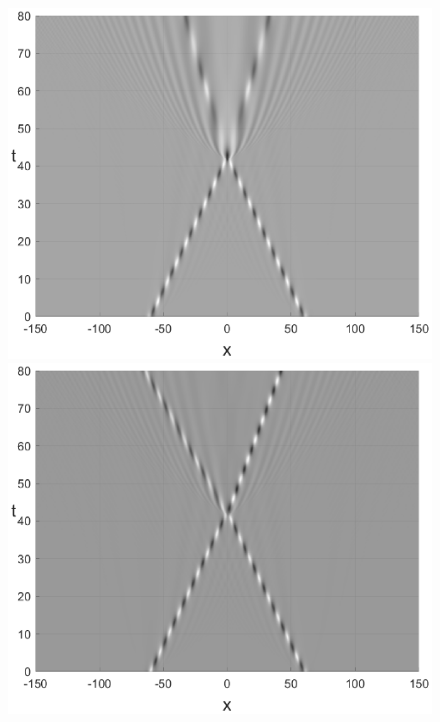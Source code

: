 \documentclass[preprint,12pt]{elsarticle}
\begin{document}
\begin{figure}[H]
\begin{minipage}[h]{0.32\linewidth}
\includegraphics[width=1\linewidth]{fig53g.eps}
\end{minipage}
\begin{minipage}[h]{0.32\linewidth}
\includegraphics[width=1\linewidth]{fig56g.eps}
\end{minipage}

\end{figure}
\end{document}
